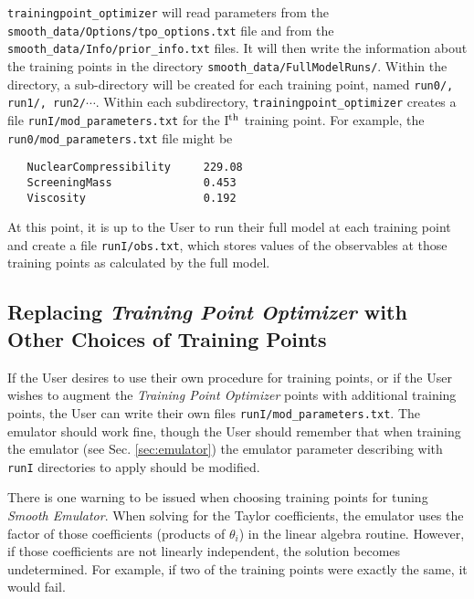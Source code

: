 \documentclass[UserManual.tex]{subfiles}
\begin{document}
{\tt trainingpoint\_optimizer} will read parameters from the {\tt smooth\_data/Options/tpo\_options.txt} file and from the {\tt smooth\_data/Info/prior\_info.txt} files. It will then write the information about the training points in the directory {\tt smooth\_data/FullModelRuns/}. Within the directory, a sub-directory will be created for each training point, named {\tt run0/, run1/, run2/}$\cdots$. Within each subdirectory, {\tt trainingpoint\_optimizer} creates a file {\tt runI/mod\_parameters.txt} for the I$^{\rm th}$ training point. For example, the {\tt run0/mod\_parameters.txt} file might be
{\tt\begin{verbatim}
   NuclearCompressibility     229.08
   ScreeningMass              0.453
   Viscosity                  0.192
\end{verbatim}
}
At this point, it is up to the User to run their full model at each training point and create a file {\tt runI/obs.txt}, which stores values of the observables at those training points as calculated by the full model. 

\subsection{Replacing {\it Training Point Optimizer} with Other Choices of Training Points}

If the User desires to use their own procedure for training points, or if the User wishes to augment the {\it Training Point Optimizer} points with additional training points, the User can write their own files {\tt runI/mod\_parameters.txt}. The emulator should work fine, though the User should remember that when training the emulator (see Sec. \ref{sec:emulator}) the emulator parameter describing with {\tt runI} directories to apply should be modified.

There is one warning to be issued when choosing training points for tuning {\it Smooth Emulator}. When solving for the Taylor coefficients, the emulator uses the factor of those coefficients (products of $\theta_i$) in the linear algebra routine. However, if those coefficients are not linearly independent, the solution becomes undetermined. For example, if two of the training points were exactly the same, it would fail. 
\end{document}

